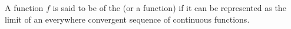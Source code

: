A function $f$ is said to be of the  (or a  function) if it can be represented as the limit of an everywhere convergent sequence of continuous functions.

